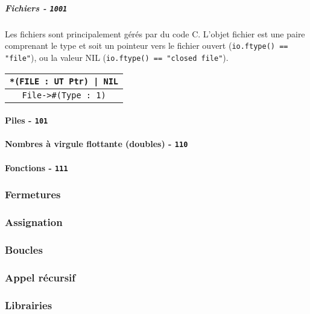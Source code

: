 \documentclass{article}
\begin{document}
\subparagraph{Fichiers - \texttt{1001}}
Les fichiers sont principalement gérés par du code C. L'objet fichier est une paire comprenant le type et soit un pointeur vers le fichier ouvert ({\lstset{style=lua}\lstinline$io.ftype() == "file"$}), ou la valeur NIL ({\lstset{style=lua}\lstinline$io.ftype() == "closed file"$}).
\begin{center}
\begin{tabular}{|c|}
    \hline
    \texttt{*(FILE : UT Ptr) | NIL}\\
    \hline
    \texttt{File->\#{}(Type : 1)}\\
    \hline
\end{tabular}
\end{center}

\paragraph{Piles - \texttt{101}}
\paragraph{Nombres à virgule flottante (doubles) - \texttt{110}}
\paragraph{Fonctions - \texttt{111}}

\subsubsection{Fermetures}

\subsubsection{Assignation}

\subsubsection{Boucles}

\subsubsection{Appel récursif}

\subsubsection{Librairies}
\end{document}
